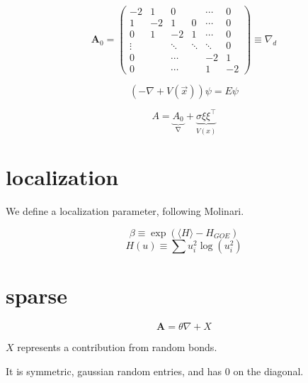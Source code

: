 \documentclass{article}
\begin{document}
\begin{equation}
	\boldsymbol{A}_0 = 
\begin{pmatrix}
	-2 & 1 & 0 & &\cdots & 0 \\
	1 & -2 & 1 & 0 & \cdots & 0 \\
	0 & 1 & -2 & 1 & \cdots & 0  \\
	\vdots & &\ddots& \ddots  & \ddots & 0\\
	0& & \cdots && -2 & 1\\
	0 & & \cdots & &1& -2
\end{pmatrix} \equiv \nabla_d
\end{equation}


\begin{equation}
	\left( -\nabla + V(\vec{x})\right) \psi = E\psi
\end{equation}

\begin{equation}
	A = \underbrace{A_0}_{\nabla} + \underbrace{\sigma\xi \xi^\intercal}_{V(x)}
\end{equation}

\section{localization}%
\label{sec:localization}

We define a localization parameter, following Molinari.

\begin{equation}
	\beta \equiv \exp{\left( \langle H \rangle - H_{GOE} \right)}
\end{equation}
\begin{equation}
	H \left( u \right)\equiv \sum u_i ^2 \log{\left( u_i^2 \right)}
\end{equation}

\section{sparse}%
\label{sec:sparse}

\begin{equation}
	\boldsymbol{A} = \theta \nabla + X
\end{equation}

$X$ represents a contribution from random bonds. 

It is symmetric, gaussian random entries, and has 0 on the diagonal.


\end{document}
